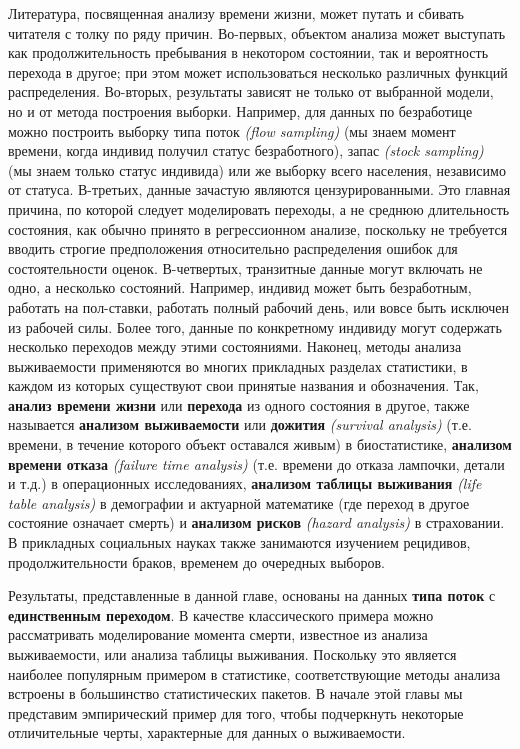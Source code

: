 Литература, посвященная анализу времени жизни, может путать и сбивать читателя с толку по ряду причин.
Во-первых, объектом анализа может выступать как продолжительность пребывания в некотором состоянии, так и вероятность перехода в другое; при этом может использоваться несколько различных функций распределения.
Во-вторых, результаты зависят не только от выбранной модели, но и от метода построения выборки. Например, для данных по безработице можно построить выборку типа поток \emph{(flow sampling)} (мы знаем момент времени, когда индивид получил статус безработного), запас \emph{(stock sampling)} (мы знаем только статус индивида) или же выборку всего населения, независимо от статуса.
В-третьих, данные зачастую являются цензурированными. Это главная причина, по которой следует моделировать переходы, а не среднюю длительность состояния, как обычно принято в регрессионном анализе, поскольку не требуется вводить строгие предположения относительно распределения ошибок для состоятельности оценок.
В-четвертых, транзитные данные могут включать не одно, а несколько состояний. Например, индивид может быть безработным, работать на пол-ставки, работать полный рабочий день, или вовсе быть исключен из рабочей силы. Более того, данные по конкретному индивиду могут содержать несколько переходов между этими состояниями.
Наконец, методы анализа выживаемости применяются во многих прикладных разделах статистики, в каждом из которых существуют свои принятые названия и обозначения. Так,
    \textbf{анализ времени жизни} или \textbf{перехода} из одного состояния в другое, также называется \textbf{анализом выживаемости} или \textbf{дожития} \emph{(survival analysis)} (т.е. времени, в течение которого объект оставался живым) в биостатистике,
    \textbf{анализом времени отказа} \emph{(failure time analysis)} (т.е. времени до отказа лампочки, детали и т.д.) в операционных исследованиях,
    \textbf{анализом таблицы выживания} \emph{(life table analysis)} в демографии и актуарной математике (где переход в другое состояние означает смерть) и
    \textbf{анализом рисков} \emph{(hazard analysis)} в страховании.
    В прикладных социальных науках также занимаются изучением рецидивов, продолжительности браков, временем до очередных выборов.

Результаты, представленные в данной главе, основаны на данных \textbf{типа поток} с \textbf{единственным переходом}. В качестве классического примера можно рассматривать моделирование момента смерти, известное из анализа выживаемости, или анализа таблицы выживания. Поскольку это является наиболее популярным примером в статистике, соответствующие методы анализа встроены в большинство статистических пакетов. В начале этой главы мы представим эмпирический пример для того, чтобы подчеркнуть некоторые отличительные черты, характерные для данных о выживаемости.

